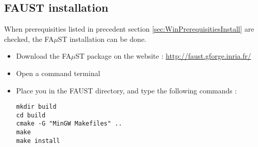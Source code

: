 \subsection{FAUST installation}\label{sec:WinFaustInstall}
When prerequisities listed in precedent section \ref{sec:WinPrerequisitiesInstall} are checked, the FA$\mu$ST installation can be done. 
\begin{itemize}
\item Download the FA$\mu$ST package on the website :  \url{http://faust.gforge.inria.fr/}
\item Open a command terminal
\item Place you in the FAUST directory, and type the following commands : 
\begin{lstlisting}
mkdir build
cd build
cmake -G "MinGW Makefiles" ..
make
make install
\end{lstlisting}
\end{itemize}


